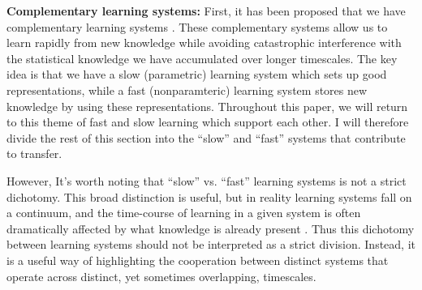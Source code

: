 \documentclass[11pt]{article}
\begin{document}
\textbf{Complementary learning systems:} First, it has been proposed that we have complementary learning systems \citep{McClelland1995, Kumaran2016}. These complementary systems allow us to learn rapidly from new knowledge while avoiding catastrophic interference \citep{McCloskey1989} with the statistical knowledge we have accumulated over longer timescales. The key idea is that we have a slow (parametric) learning system which sets up good representations, while a fast (nonparamteric) learning system stores new knowledge by using these representations. Throughout this paper, we will return to this theme of fast and slow learning which support each other. I will therefore divide the rest of this section into the ``slow'' and ``fast'' systems that contribute to transfer.\par
However, It's worth noting that ``slow'' vs. ``fast'' learning systems is not a strict dichotomy. This broad distinction is useful, but in reality learning systems fall on a continuum, and the time-course of learning in a given system is often dramatically affected by what knowledge is already present \citep[e.g.]{McClelland2013}. Thus this dichotomy between learning systems should not be interpreted as a strict division. Instead, it is a useful way of highlighting the cooperation between distinct systems that operate across distinct, yet sometimes overlapping, timescales. \par 
\end{document}
